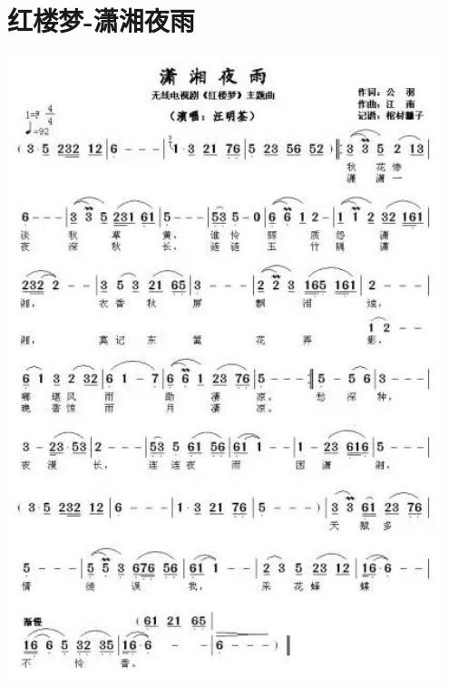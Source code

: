 \documentclass[cn,pad,twocol]{elegantbook}
\begin{document}
\section{红楼梦-潇湘夜雨}\includegraphics[width=0.95\textwidth]{dongxiao/20200819/红楼梦-潇湘夜雨.jpeg}
\end{document}
